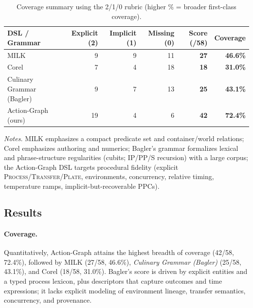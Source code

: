 \documentclass[sigconf]{acmart}
\begin{document}
\begin{table}[t]
    \centering
    \setlength{\tabcolsep}{8pt}

    \caption{Coverage summary using the 2/1/0 rubric (higher \% = broader first-class coverage).}
    \label{tab:coverage-summary}
    
    \begin{tabular*}{\textwidth}{@{\extracolsep{\fill}}lrrrrr}
        \toprule
        \textbf{DSL / Grammar} & \textbf{Explicit (2)} & \textbf{Implicit (1)} & \textbf{Missing (0)} & \textbf{Score (/58)} & \textbf{Coverage} \\
        \midrule
        MILK \cite{tasse2008sourcream}                & 9  & 9  & 11 & \textbf{27} & \textbf{46.6\%} \\
        Corel \cite{roorda2021corel}                  & 7  & 4  & 18 & \textbf{18} & \textbf{31.0\%} \\
        Culinary Grammar (Bagler) \cite{bagler2022generative} & 9  & 7  & 13 & \textbf{25} & \textbf{43.1\%} \\
        Action-Graph (ours)                           & 19 & 4  &  6 & \textbf{42} & \textbf{72.4\%} \\
        \bottomrule
    \end{tabular*}

    \medskip
    \emph{Notes.} MILK emphasizes a compact predicate set and container/world relations; Corel emphasizes authoring and numerics; Bagler’s grammar formalizes lexical and phrase-structure regularities (cubits; IP/PP/S recursion) with a large corpus; the Action-Graph DSL targets procedural fidelity (explicit \textsc{Process}/\textsc{Transfer}/\textsc{Plate}, environments, concurrency, relative timing, temperature ramps, implicit-but-recoverable PPCs).
\end{table}

\subsection{Results}

\paragraph{Coverage.} Quantitatively, Action-Graph attains the highest breadth of coverage (42/58, 72.4\%), followed by MILK (27/58, 46.6\%), \emph{Culinary Grammar (Bagler)} (25/58, 43.1\%), and Corel (18/58, 31.0\%). Bagler’s score is driven by explicit entities and a typed process lexicon, plus descriptors that capture outcomes and time expressions; it lacks explicit modeling of environment lineage, transfer semantics, concurrency, and provenance.
\end{document}
